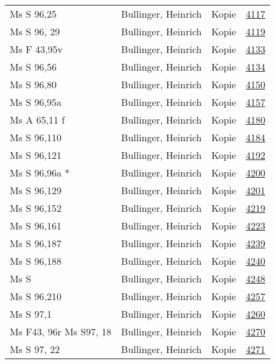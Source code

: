 \documentclass[10pt,a4paper,landscape]{report}
\begin{document}
\begin{longtable}{p{16cm}p{4cm}lr}
Ms S 96,25	&	Bullinger, Heinrich	&	Kopie	&	\href{http://130.60.24.72/assignment/4117}{4117}\\
Ms S 96, 29	&	Bullinger, Heinrich	&	Kopie	&	\href{http://130.60.24.72/assignment/4119}{4119}\\
Ms F 43,95v	&	Bullinger, Heinrich	&	Kopie	&	\href{http://130.60.24.72/assignment/4133}{4133}\\
Ms S 96,56	&	Bullinger, Heinrich	&	Kopie	&	\href{http://130.60.24.72/assignment/4134}{4134}\\
Ms S 96,80	&	Bullinger, Heinrich	&	Kopie	&	\href{http://130.60.24.72/assignment/4150}{4150}\\
Ms S 96,95a	&	Bullinger, Heinrich	&	Kopie	&	\href{http://130.60.24.72/assignment/4157}{4157}\\
Ms A 65,11 f	&	Bullinger, Heinrich	&	Kopie	&	\href{http://130.60.24.72/assignment/4180}{4180}\\
Ms S 96,110	&	Bullinger, Heinrich	&	Kopie	&	\href{http://130.60.24.72/assignment/4184}{4184}\\
Ms S 96,121	&	Bullinger, Heinrich	&	Kopie	&	\href{http://130.60.24.72/assignment/4192}{4192}\\
Ms S 96,96a *	&	Bullinger, Heinrich	&	Kopie	&	\href{http://130.60.24.72/assignment/4200}{4200}\\
Ms S 96,129	&	Bullinger, Heinrich	&	Kopie	&	\href{http://130.60.24.72/assignment/4201}{4201}\\
Ms S 96,152	&	Bullinger, Heinrich	&	Kopie	&	\href{http://130.60.24.72/assignment/4219}{4219}\\
Ms S 96,161	&	Bullinger, Heinrich	&	Kopie	&	\href{http://130.60.24.72/assignment/4223}{4223}\\
Ms S 96,187	&	Bullinger, Heinrich	&	Kopie	&	\href{http://130.60.24.72/assignment/4239}{4239}\\
Ms S 96,188	&	Bullinger, Heinrich	&	Kopie	&	\href{http://130.60.24.72/assignment/4240}{4240}\\
Ms S	&	Bullinger, Heinrich	&	Kopie	&	\href{http://130.60.24.72/assignment/4248}{4248}\\
Ms S 96,210	&	Bullinger, Heinrich	&	Kopie	&	\href{http://130.60.24.72/assignment/4257}{4257}\\
Ms S 97,1	&	Bullinger, Heinrich	&	Kopie	&	\href{http://130.60.24.72/assignment/4260}{4260}\\
Ms F43, 96r  Ms S97, 18	&	Bullinger, Heinrich	&	Kopie	&	\href{http://130.60.24.72/assignment/4270}{4270}\\
Ms S 97, 22	&	Bullinger, Heinrich	&	Kopie	&	\href{http://130.60.24.72/assignment/4271}{4271}\\

\end{longtable}
\end{document}
